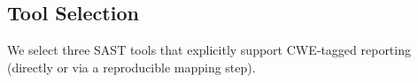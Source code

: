 
\subsection{Tool Selection}
We select three SAST tools that explicitly support CWE‑tagged reporting (directly or via a reproducible mapping step).


